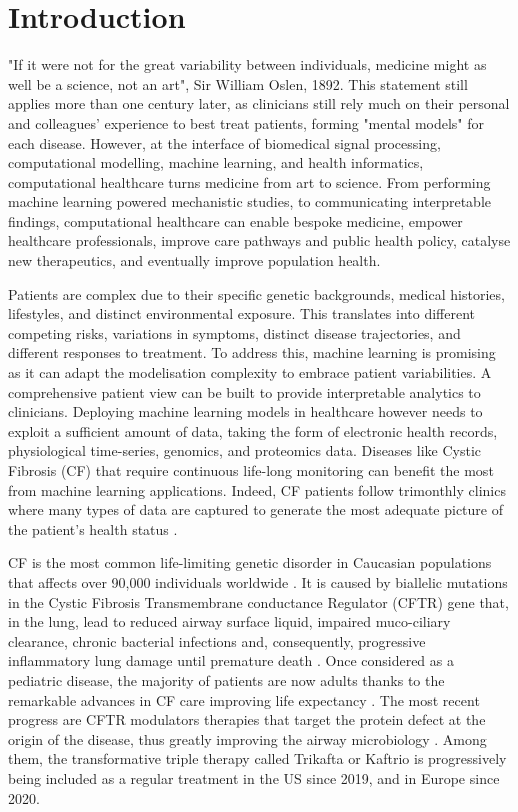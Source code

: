 \chapter{Introduction}

"If it were not for the great variability between individuals, medicine might as well be a science, not an art", Sir William Oslen, 1892. This statement still applies more than one century later, as clinicians still rely much on their personal and colleagues' experience to best treat patients, forming "mental models" for each disease. However, at the interface of biomedical signal processing, computational modelling, machine learning, and health informatics, computational healthcare turns medicine from art to science. From performing machine learning powered mechanistic studies, to communicating interpretable findings, computational healthcare can enable bespoke medicine, empower healthcare professionals, improve care pathways and public health policy, catalyse new therapeutics, and eventually improve population health.

Patients are complex due to their specific genetic backgrounds, medical histories, lifestyles, and distinct environmental exposure. This translates into different competing risks, variations in symptoms, distinct disease trajectories, and different responses to treatment. To address this, machine learning is promising as it can adapt the modelisation complexity to embrace patient variabilities. A comprehensive patient view can be built to provide interpretable analytics to clinicians. Deploying machine learning models in healthcare however needs to exploit a sufficient amount of data, taking the form of electronic health records, physiological time-series, genomics, and proteomics data. Diseases like Cystic Fibrosis (CF) that require continuous life-long monitoring can benefit the most from machine learning applications. Indeed, CF patients follow trimonthly clinics where many types of data are captured to generate the most adequate picture of the patient's health status \cite{gartner_2019}.

CF is the most common life-limiting genetic disorder in Caucasian populations that affects over 90,000 individuals worldwide \cite{bell_mall_2020}. It is caused by biallelic mutations in the Cystic Fibrosis Transmembrane conductance Regulator (CFTR) gene that, in the lung, lead to reduced airway surface liquid, impaired muco-ciliary clearance, chronic bacterial infections and, consequently, progressive inflammatory lung damage until premature death \cite{ratjen_bell_2015}\cite{elborn_2016}. Once considered as a pediatric disease, the majority of patients are now adults thanks to the remarkable advances in CF care improving life expectancy \cite{cff_registry_2019}. The most recent progress are CFTR modulators therapies that target the protein defect at the origin of the disease, thus greatly improving the airway microbiology \cite{rogers_2020}. Among them, the transformative triple therapy called Trikafta or Kaftrio is progressively being included as a regular treatment in the US since 2019, and in Europe since 2020.

